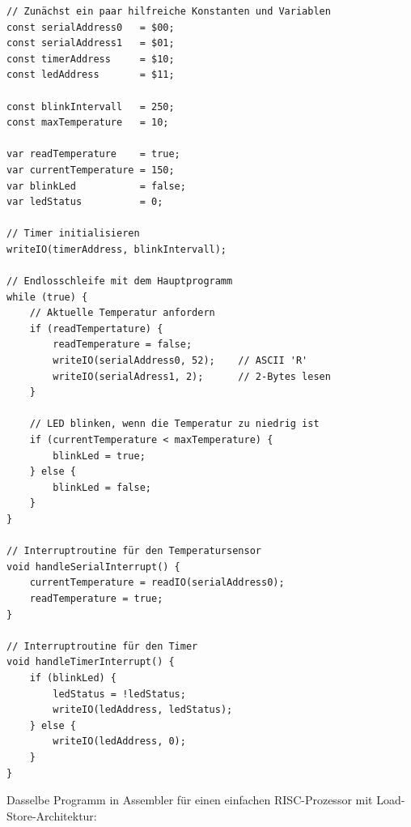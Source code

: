 {
\footnotesize

\begin{verbatim}
// Zunächst ein paar hilfreiche Konstanten und Variablen
const serialAddress0   = $00;
const serialAddress1   = $01;
const timerAddress     = $10;
const ledAddress       = $11;

const blinkIntervall   = 250;
const maxTemperature   = 10;

var readTemperature    = true;
var currentTemperature = 150;
var blinkLed           = false;
var ledStatus          = 0;

// Timer initialisieren
writeIO(timerAddress, blinkIntervall);

// Endlosschleife mit dem Hauptprogramm
while (true) {
    // Aktuelle Temperatur anfordern
    if (readTempertature) {
        readTemperature = false;
        writeIO(serialAddress0, 52);    // ASCII 'R'
        writeIO(serialAdress1, 2);      // 2-Bytes lesen
    }

    // LED blinken, wenn die Temperatur zu niedrig ist
    if (currentTemperature < maxTemperature) {
        blinkLed = true;
    } else {
        blinkLed = false;
    }
}

// Interruptroutine für den Temperatursensor
void handleSerialInterrupt() {
    currentTemperature = readIO(serialAddress0);
    readTemperature = true;
}

// Interruptroutine für den Timer
void handleTimerInterrupt() {
    if (blinkLed) {
        ledStatus = !ledStatus;
        writeIO(ledAddress, ledStatus);
    } else {
        writeIO(ledAddress, 0);
    }
}
\end{verbatim}
}

\clearpage
\teilaufgabe
Dasselbe Programm in Assembler für einen einfachen RISC-Prozessor mit
Load-Store-Architektur:

